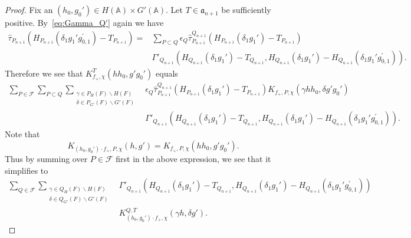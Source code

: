 \documentclass[10pt,a4paper]{amsart}
\newcommand{\bA}{\mathbb{A}}
\newcommand{\cF}{\mathcal{F}}
\newcommand{\fa}{\mathfrak{a}}
\begin{document}
\begin{proof}
Fix an $(h_0,g_0') \in H(\bA) \times G'(\bA)$. Let $T \in \fa_{n+1}$ be
sufficiently positive. By~\eqref{eq:Gamma_Q'} again we have
    \begin{align*}
     \widehat{\tau}_{P_{n+1}}(H_{P_{n+1}}(\delta_1 g_1'g_{0,1}^{\prime})
     -T_{P_{n+1}})
     = & \sum_{P \subset Q}  \epsilon_Q \widehat{\tau}_{P_{n+1}}^{Q_{n+1}}
     ( H_{P_{n+1}}(\delta_1 g_1') - T_{P_{n+1}} )\\
     &\Gamma'_{Q_{n+1}} ( H_{Q_{n+1}}(\delta_1 g_1')-T_{Q_{n+1}},H_{Q_{n+1}}
     (\delta_1 g_1') - H_{Q_{n+1}}(\delta_1 g_1' g_{0,1}^{\prime})).
    \end{align*}
Therefore we see that $K_{f_+,\chi}^T(h h_0, g' g_0')$ equals
    \[
    \begin{aligned}
    \sum_{P \in \cF}
    \sum_{P \subset Q} \sum_{ \substack{\gamma \in P_H(F)
    \backslash H(F) \\ \delta \in P_{G'}(F)\backslash G'(F)}}
    & \epsilon_Q \widehat{\tau}_{P_{n+1}}^{Q_{n+1}}
     ( H_{P_{n+1}}(\delta_1 g_1') - T_{P_{n+1}} )
     K_{f_+, P, \chi}(\gamma h h_0,\delta g' g_0')\\
    &\Gamma'_{Q_{n+1}}(H_{Q_{n+1}}(\delta_1 g_1')-T_{Q_{n+1}},H_{Q_{n+1}}
    (\delta_1 g_1')-H_{Q_{n+1}}(\delta_1 g_1' g_{0,1}^{\prime})).
    \end{aligned}
    \]
Note that
    \[
    K_{(h_0, g_0') \cdot f_+, P, \chi}(h,g')=
    K_{f_+, P, \chi}(h h_0, g' g_0').
    \]
Thus by summing over $P \in \cF$ first in  the above expression, we see that
it simplifies to
    \begin{equation}    \label{eq:invariance_GL_1}
    \begin{aligned}
    \sum_{Q \in \cF} \sum_{ \substack{\gamma \in Q_H(F)
    \backslash H(F) \\ \delta \in Q_{G'}(F)\backslash G'(F)}}
    &\Gamma'_{Q_{n+1}}(H_{Q_{n+1}}(\delta_1 g_1')-T_{Q_{n+1}},H_{Q_{n+1}}
    (\delta_1 g_1')-H_{Q_{n+1}}(\delta_1 g_1' g_{0,1}^{\prime}))\\
    &K_{(h_0, g_0') \cdot f_+, \chi}^{Q, T}(\gamma h,\delta g').
    \end{aligned}
    \end{equation}


\end{proof}
\end{document}
